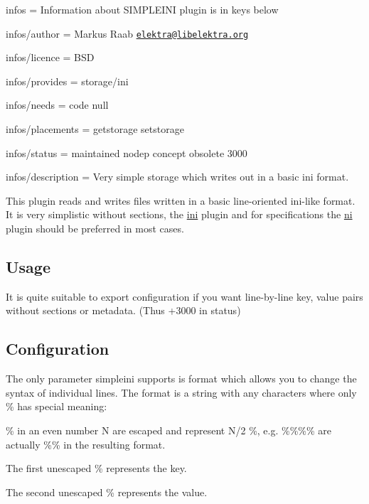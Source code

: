 
\begin{DoxyItemize}
\item infos = Information about S\+I\+M\+P\+L\+E\+I\+N\+I plugin is in keys below
\item infos/author = Markus Raab \href{mailto:elektra@libelektra.org}{\tt elektra@libelektra.\+org}
\item infos/licence = B\+S\+D
\item infos/provides = storage/ini
\item infos/needs = code null
\item infos/placements = getstorage setstorage
\item infos/status = maintained nodep concept obsolete 3000
\item infos/description = Very simple storage which writes out in a basic ini format.
\end{DoxyItemize}

This plugin reads and writes files written in a basic line-\/oriented ini-\/like format. It is very simplistic without sections, the \hyperlink{md_src_plugins_ini_README_src_plugins_ini_README_md}{ini} plugin and for specifications the \hyperlink{md_src_plugins_ni_README_src_plugins_ni_README_md}{ni} plugin should be preferred in most cases.

\subsection*{Usage}

It is quite suitable to export configuration if you want line-\/by-\/line key, value pairs without sections or metadata. (Thus +3000 in status) 


\subsection*{Configuration}

The only parameter simpleini supports is {\ttfamily format} which allows you to change the syntax of individual lines. The {\ttfamily format} is a string with any characters where only {\ttfamily \%} has special meaning\+:


\begin{DoxyItemize}
\item {\ttfamily \%} in an even number N are escaped and represent N/2 {\ttfamily \%}, e.\+g. {\ttfamily \%\%\%\%} are actually {\ttfamily \%\%} in the resulting format.
\item The first unescaped {\ttfamily \%} represents the key.
\item The second unescaped {\ttfamily \%} represents the value.
\end{DoxyItemize}


